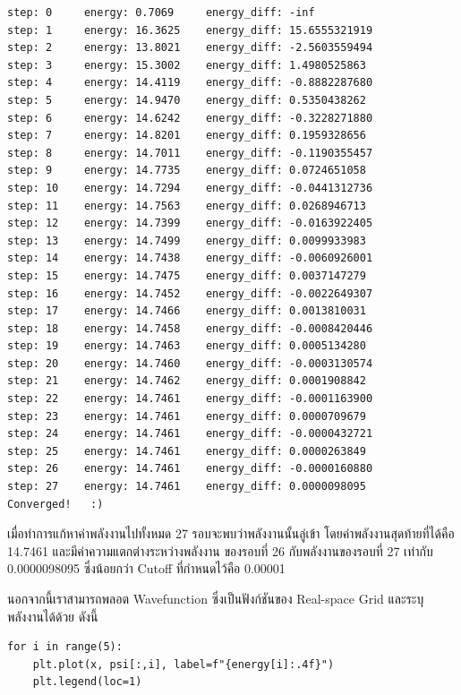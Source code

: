 \begin{lstlisting}[style=MyPython]
step: 0     energy: 0.7069     energy_diff: -inf
step: 1     energy: 16.3625    energy_diff: 15.6555321919
step: 2     energy: 13.8021    energy_diff: -2.5603559494
step: 3     energy: 15.3002    energy_diff: 1.4980525863
step: 4     energy: 14.4119    energy_diff: -0.8882287680
step: 5     energy: 14.9470    energy_diff: 0.5350438262
step: 6     energy: 14.6242    energy_diff: -0.3228271880
step: 7     energy: 14.8201    energy_diff: 0.1959328656
step: 8     energy: 14.7011    energy_diff: -0.1190355457
step: 9     energy: 14.7735    energy_diff: 0.0724651058
step: 10    energy: 14.7294    energy_diff: -0.0441312736
step: 11    energy: 14.7563    energy_diff: 0.0268946713
step: 12    energy: 14.7399    energy_diff: -0.0163922405
step: 13    energy: 14.7499    energy_diff: 0.0099933983
step: 14    energy: 14.7438    energy_diff: -0.0060926001
step: 15    energy: 14.7475    energy_diff: 0.0037147279
step: 16    energy: 14.7452    energy_diff: -0.0022649307
step: 17    energy: 14.7466    energy_diff: 0.0013810031
step: 18    energy: 14.7458    energy_diff: -0.0008420446
step: 19    energy: 14.7463    energy_diff: 0.0005134280
step: 20    energy: 14.7460    energy_diff: -0.0003130574
step: 21    energy: 14.7462    energy_diff: 0.0001908842
step: 22    energy: 14.7461    energy_diff: -0.0001163900
step: 23    energy: 14.7461    energy_diff: 0.0000709679
step: 24    energy: 14.7461    energy_diff: -0.0000432721
step: 25    energy: 14.7461    energy_diff: 0.0000263849
step: 26    energy: 14.7461    energy_diff: -0.0000160880
step: 27    energy: 14.7461    energy_diff: 0.0000098095
Converged!   :)
\end{lstlisting}

เมื่อทำการแก้หาค่าพลังงานไปทั้งหมด 27 รอบจะพบว่าพลังงานนั้นลู่เข้า โดยค่าพลังงานสุดท้ายที่ได้คือ 14.7461 และมีค่าความแตกต่างระหว่างพลังงาน%
ของรอบที่ 26 กับพลังงานของรอบที่ 27 เท่ากับ 0.0000098095 ซึ่งน้อยกว่า Cutoff ที่กำหนดไว้คือ 0.00001

\noindent นอกจากนี้เราสามารถพลอต Wavefunction ซึ่งเป็นฟังก์ชันของ Real-space Grid และระบุพลังงานได้ด้วย ดังนี้

\begin{lstlisting}[style=MyPython]
for i in range(5):
    plt.plot(x, psi[:,i], label=f"{energy[i]:.4f}")
    plt.legend(loc=1)
\end{lstlisting}

